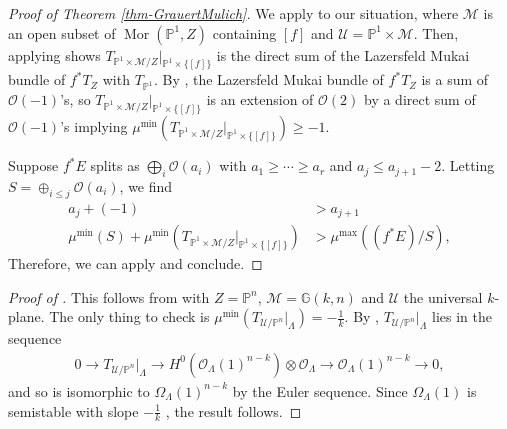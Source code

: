 \documentclass[11pt,reqno]{amsart}
\theoremstyle{plain}
\theoremstyle{definition}
\theoremstyle{remark}
\numberwithin{equation}{section}
\newcommand{\cO}{{\mathscr O}}
\renewcommand{\to}{{\longrightarrow}}
\numberwithin{equation}{section}
\newcommand{\OO}{\mathscr{O}}
\newcommand{\PP}{\mathbb{P}}
\newcommand{\cM}{\mathcal{M}}
\newcommand{\cU}{\mathcal{U}}
\begin{document}
\begin{proof}[Proof of Theorem \ref{thm-GrauertMulich}]
We apply  to our situation, where $\cM$ is an open subset of $\operatorname{Mor}(\mathbb{P}^1,Z)$ containing $[f]$ and $\cU=\PP^1\times \cM$. Then, applying  shows $T_{\PP^1\times\cM/Z}|_{\PP^1\times\{[f]\}}$ is the direct sum of the Lazersfeld Mukai bundle of $f^{*}T_Z$ with $T_{\PP^1}$. By , the Lazersfeld Mukai bundle of $f^{*}T_Z$ is a sum of $\OO(-1)$'s, so $T_{\PP^1\times\cM/Z}|_{\PP^1\times\{[f]\}}$ is an extension of $\OO(2)$ by a direct sum of $\OO(-1)$'s implying $\mu^{\min}(T_{\PP^1\times\cM/Z}|_{\PP^1\times\{[f]\}}) \geq -1$.

Suppose $f^{*}E$ splits as $\bigoplus_i \cO(a_i)$ with $a_1 \geq \cdots \geq a_r$ and $a_j \leq a_{j+1}-2$. Letting $S=\oplus _{i\leq j}\cO(a_i)$, we find
\begin{align*}
    a_j + (-1) &>a_{j+1}\\
    \mu^{\min}(S)+\mu^{\min}(T_{\PP^1\times\cM/Z}|_{\PP^1\times\{[f]\}})&>\mu^{\max}((f^{*}E)/S),
\end{align*}
Therefore, we can apply   and conclude.

\end{proof}

\begin{proof}[Proof of ]
This follows from  with $Z=\mathbb{P}^n$, $\cM=\mathbb{G}(k,n)$ and $\cU$ the universal $k$-plane. The only thing to check is $\mu^{\min}(T_{\cU/\mathbb{P}^n}|_\Lambda)=-\frac{1}{k}$. By , $T_{\cU/\mathbb{P}^n}|_\Lambda$ lies in the sequence
\begin{align*}
    0\to T_{\cU/\mathbb{P}^n}|_{\Lambda}\to H^0(\OO_{\Lambda}(1)^{n-k})\otimes \OO_{\Lambda}\to \OO_{\Lambda}(1)^{n-k} \to 0,
\end{align*}
and so is isomorphic to $\Omega_{\Lambda}(1)^{n-k}$ by the Euler sequence. Since $\Omega_{\Lambda}(1)$ is semistable with slope $-\frac{1}{k}$ \cite[Theorem 1.3.2]{OSS80}, the result follows.
\end{proof}
\end{document}
